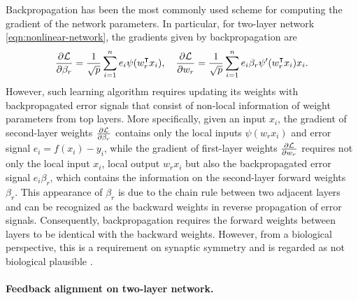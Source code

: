 Backpropagation has been the most commonly used scheme for computing the gradient of the network parameters. In particular, for two-layer network \eqref{eqn:nonlinear-network}, the gradients given by backpropagation are
\begin{equation*}
    \frac{\partial\Loss}{\partial \beta_r} = \frac{1}{\sqrt p}\sum_{i=1}^n e_i\psi(w_r\transpose x_i), \quad
    \frac{\partial\Loss}{\partial w_r} = \frac{1}{\sqrt p} \sum_{i=1}^n e_i \beta_r\psi'(w_r\transpose x_i)x_i.
\end{equation*}
However, such learning algorithm requires updating its weights with backpropagated error signals that consist of non-local information of weight parameters from top layers. More specifically, given an input $x_i$, the gradient of second-layer weights $\frac{\partial \mathcal{L}}{\partial \beta_r}$ contains only the local inputs $\psi(w_r x_i)$ and error signal $e_i = f(x_i) - y_i$, while the gradient of first-layer weights $\frac{\partial \mathcal{L}}{\partial w_r}$ requires not only the local input $x_i$, local output $w_r x_i$ but also the backpropagated error signal $e_i\beta_r$, which contains the information on the second-layer forward weights $\beta_r$. This appearance of $\beta_r$ is due to the chain rule between two adjacent layers and can be recognized as the backward weights in reverse propagation of error signals.
Consequently, backpropagation requires the forward weights between layers to be identical with the backward weights. However, from a biological perspective, this is a requirement on synaptic symmetry and is regarded as not biological plausible \citep{lillicrap2016random}. 

\paragraph{Feedback alignment on two-layer network.}

